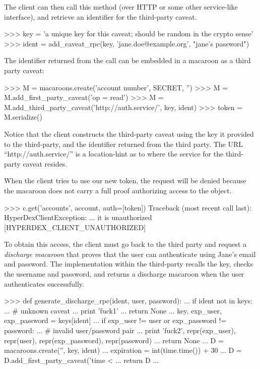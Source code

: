 The client can then call this method (over HTTP or some other service-like
interface), and retrieve an identifier for the third-party caveat.

\begin{pythoncode}
>>> key = 'a unique key for this caveat; should be random in the crypto sense'
>>> ident = add_caveat_rpc(key, 'jane.doe@example.org', "jane's password")
\end{pythoncode}

The identifier returned from the  call can be embedded in
a macaroon as a third party caveat:

\begin{pythoncode}
>>> M = macaroons.create('account number', SECRET, '')
>>> M = M.add_first_party_caveat('op = read')
>>> M = M.add_third_party_caveat('http://auth.service/', key, ident)
>>> token = M.serialize()
\end{pythoncode}

Notice that the client constructs the third-party caveat using the key it
provided to the third-party, and the identifier returned from the third party.
The URL ``http://auth.service/'' is a location-hint as to where the service for
the third-party caveat resides.

When the client tries to use our new token, the request will be denied because
the macaroon does not carry a full proof authorizing access to the object.

\begin{pythoncode}
>>> c.get('accounts', account, auth=[token])
Traceback (most recent call last):
HyperDexClientException: ... it is unauthorized [HYPERDEX_CLIENT_UNAUTHORIZED]
\end{pythoncode}

To obtain this access, the client must go back to the third party and request a
{\em discharge macaroon} that proves that the user can authenticate using Jane's
email and password.  The implementation within the third-party recalls the key,
checks the username and password, and returns a discharge macaroon when the user
authenticates successfully.

\begin{pythoncode}
>>> def generate_discharge_rpc(ident, user, password):
...     if ident not in keys:
...         # unknown caveat
...         print 'fuck1'
...         return None
...     key, exp_user, exp_password = keys[ident]
...     if exp_user != user or exp_password != password:
...         # invalid user/password pair
...         print 'fuck2', repr(exp_user), repr(user), repr(exp_password), repr(password)
...         return None
...     D = macaroons.create('', key, ident)
...     expiration = int(time.time()) + 30
...     D = D.add_first_party_caveat('time < %
...     return D
...
\end{pythoncode}

